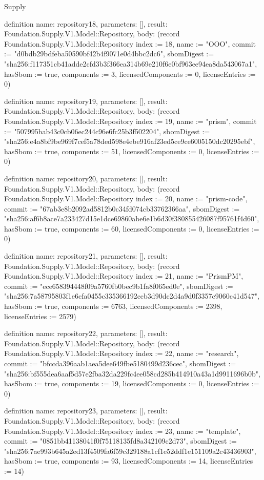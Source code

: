 \begin{lexlean}{Supply}
\begin{semanticmodule}
definition{
  name: repository18,
  parameters: [],
  result: Foundation.Supply.V1.Model::Repository,
  body: (record Foundation.Supply.V1.Model::Repository {index := 18, name := "OOO", commit := "d0bdb29bdfeba50590bf42b4f9071e0d4bbc2dc6", sbomDigest := "sha256:f117351cb41adde2cfd3b3f366ea314b69e210f6e0bf963ee94ea8da543067a1", hasSbom := true, components := 3, licensedComponents := 0, licenseEntries := 0})
}

definition{
  name: repository19,
  parameters: [],
  result: Foundation.Supply.V1.Model::Repository,
  body: (record Foundation.Supply.V1.Model::Repository {index := 19, name := "prism", commit := "507995bab43c0cb06ec244c96e6fc25b3f502204", sbomDigest := "sha256:e4a8bf9be969f7cef5a78ded598e4ebe916af23ed5ce9ce6005150dc20295ebf", hasSbom := true, components := 51, licensedComponents := 0, licenseEntries := 0})
}

definition{
  name: repository20,
  parameters: [],
  result: Foundation.Supply.V1.Model::Repository,
  body: (record Foundation.Supply.V1.Model::Repository {index := 20, name := "prism-code", commit := "67ab3e8b2092ad5812b0c34fd074cb33762366aa", sbomDigest := "sha256:af6b8ace7a233427d15e1dce69860abe6e1b6d30f380855426087f95761f4d60", hasSbom := true, components := 60, licensedComponents := 0, licenseEntries := 0})
}

definition{
  name: repository21,
  parameters: [],
  result: Foundation.Supply.V1.Model::Repository,
  body: (record Foundation.Supply.V1.Model::Repository {index := 21, name := "PrismPM", commit := "ece658394448f09a5760fb0bec9b1fa8f065ed0e", sbomDigest := "sha256:7a58795803f1e6cfa0455c335366192ccb3d90dc2d4a9d0f3357c9060c41d547", hasSbom := true, components := 6763, licensedComponents := 2398, licenseEntries := 2579})
}

definition{
  name: repository22,
  parameters: [],
  result: Foundation.Supply.V1.Model::Repository,
  body: (record Foundation.Supply.V1.Model::Repository {index := 22, name := "research", commit := "bfccda396aab1aea5dee649fbe5180499d236cec", sbomDigest := "sha256:bf555dea6aaf5d57e2fba32da229fc4ee058cd285b414910a43a1d9911696b0b", hasSbom := true, components := 19, licensedComponents := 0, licenseEntries := 0})
}

definition{
  name: repository23,
  parameters: [],
  result: Foundation.Supply.V1.Model::Repository,
  body: (record Foundation.Supply.V1.Model::Repository {index := 23, name := "template", commit := "0851bb41138041f0f75118135fd8a342109c2d73", sbomDigest := "sha256:7ae993b645a2ed13f4509fa6f59c329188a1cf1e52ddf1e151109a2c43436903", hasSbom := true, components := 93, licensedComponents := 14, licenseEntries := 14})
}


\end{semanticmodule}
\end{lexlean}
